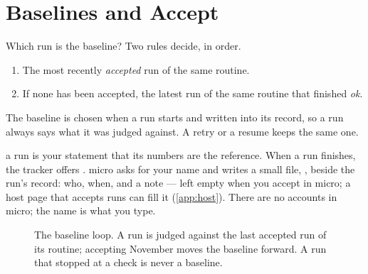 \section{Baselines and Accept}\label{sec:checks-accept}
Which run is the baseline? Two rules decide, in order.

\begin{enumerate}
\item The most recently \emph{accepted} run of the same routine.
\item If none has been accepted, the latest run of the same routine that finished \emph{ok}.
\end{enumerate}

The baseline is chosen when a run starts and written into its record, so a run always says what it was judged against. A retry or a resume keeps the same one.

 a run is your statement that its numbers are the reference. When a run finishes, the tracker offers . micro asks for your name and writes a small file, , beside the run's record: who, when, and a note — left empty when you accept in micro; a host page that accepts runs can fill it (\cref{app:host}). There are no accounts in micro; the name is what you type.

\begin{figure}[htbp]\centering
{}
\caption{The baseline loop. A run is judged against the last accepted run of its routine; accepting November moves the baseline forward. A run that stopped at a check is never a baseline.}\label{fig:checks-baseline}
\end{figure}

